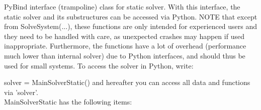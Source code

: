  \label{sec:MainSolverStatic}
PyBind interface (trampoline) class for static solver. With this interface, the static solver and its substructures can be accessed via Python. NOTE that except from SolveSystem(...), these functions are only intended for experienced users and they need to be handled with care, as unexpected crashes may happen if used inappropriate. Furthermore, the functions have a lot of overhead (performance much lower than internal solver) due to Python interfaces, and should thus be used for small systems. To access the solver in Python, write: \bi
 \item[] solver = MainSolverStatic() 
\ei
 and hereafter you can access all data and functions via 'solver'.\\ 
%
MainSolverStatic has the following items:
